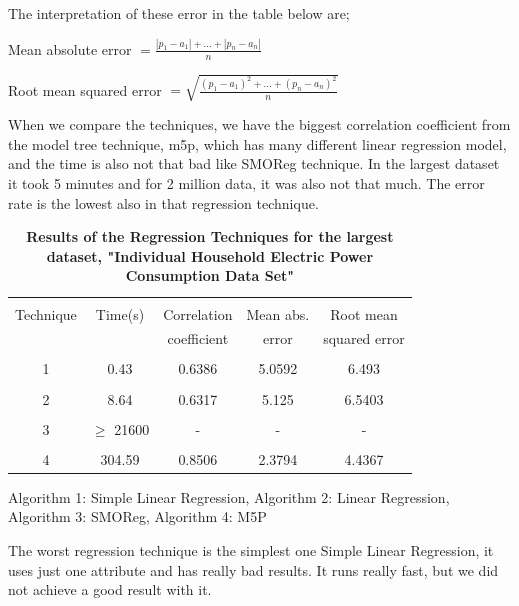 \documentclass[a4paper]{article}
\begin{document}
The interpretation of these error in the table below are;

Mean absolute error $= \frac{|p_1 - a_1| + ... + |p_n - a_n|}{n}$

Root mean squared error $=\sqrt{ \frac{(p_1 - a_1)^2 + ... + (p_n - a_n)^2}{n} }$

When we compare the techniques, we have the biggest correlation coefficient from the model tree technique, m5p, which has many different linear regression model, and the time is also not that bad like SMOReg technique. In the largest dataset it took 5 minutes and for 2 million data, it was also not that much. The error rate is the lowest also in that regression technique. 

\begin{table}
\begin{tabular}{| c | c | c |c |c |}
\hline & & & & \\
Technique & Time(s) & Correlation & Mean abs.  & Root mean \\
 & & coefficient & error & squared error  \\
\hline & & & &  \\
1  & 0.43  & 0.6386  & 5.0592  & 6.493  \\ 
\hline & & & & \\
2  & 8.64  & 0.6317  & 5.125  &  6.5403 \\ 
\hline & & & & \\
3  & $\ge$ 21600  & - & - & - \\ 
\hline & & & & \\
4  &  304.59 &  0.8506 & 2.3794 & 4.4367 \\ 
\hline
\end{tabular}
\caption{\textbf{Results of the Regression Techniques for the largest dataset, "Individual Household Electric Power Consumption Data Set" }}
    Algorithm 1: Simple Linear Regression,
    Algorithm 2: Linear Regression,
    Algorithm 3: SMOReg,
    Algorithm 4: M5P
\end{table}

The worst regression technique is the simplest one Simple Linear Regression, it uses just one attribute and has really bad results. It runs really fast, but we did not achieve a good result with it.
\end{document}
